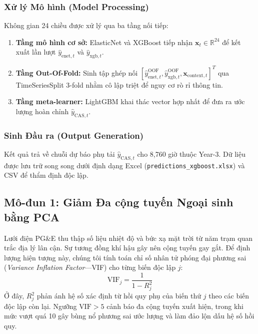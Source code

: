 \subsubsection{Xử lý Mô hình (Model Processing)}
\label{subsubsec:model_processing}
Không gian 24 chiều được xử lý qua ba tầng nối tiếp:
\begin{enumerate}
    \item \textbf{Tầng mô hình cơ sở:} ElasticNet và XGBoost tiếp nhận $\mathbf{x}_t \in \mathbb{R}^{24}$ để kết xuất lần lượt $\hat{y}_{\text{enet}, t}$ và $\hat{y}_{\text{xgb}, t}$.
    \item \textbf{Tầng Out-Of-Fold:} Sinh tập ghép nối $[\hat{y}_{\text{enet}, t}^{\text{OOF}}, \hat{y}_{\text{xgb}, t}^{\text{OOF}}, \mathbf{x}_{\text{context}, t}]^T$ qua TimeSeriesSplit 3-fold nhằm cô lập triệt để nguy cơ rò rỉ thông tin.
    \item \textbf{Tầng meta-learner:} LightGBM khai thác vector hợp nhất để đưa ra ước lượng hoàn chỉnh $\hat{y}_{\text{CAS}, t}$.
\end{enumerate}

\subsubsection{Sinh Đầu ra (Output Generation)}
Kết quả trả về chuỗi dự báo phụ tải $\hat{y}_{\text{CAS}, t}$ cho 8,760 giờ thuộc Year-3. Dữ liệu được lưu trữ song song dưới định dạng Excel (\texttt{predictions\_xgboost.xlsx}) và CSV để thẩm định độc lập.

\subsection{Mô-đun 1: Giảm Đa cộng tuyến Ngoại sinh bằng PCA}
\label{subsec:module1}

Lưới điện PG\&E thu thập số liệu nhiệt độ và bức xạ mặt trời từ năm trạm quan trắc địa lý lân cận. Sự tương đồng khí hậu gây nên cộng tuyến gay gắt. Để định lượng hiện tượng này, chúng tôi tính toán chỉ số nhân tử phóng đại phương sai (\textit{Variance Inflation Factor}---VIF) cho từng biến độc lập $j$:
\begin{equation}
    \text{VIF}_j = \frac{1}{1 - R_j^2}
\end{equation}
Ở đây, $R_j^2$ phản ánh hệ số xác định từ hồi quy phụ của biến thứ $j$ theo các biến độc lập còn lại. Ngưỡng $\text{VIF} > 5$ cảnh báo đa cộng tuyến xuất hiện, trong khi mức vượt quá 10 gây bùng nổ phương sai ước lượng và làm đảo lộn dấu hệ số hồi quy.

